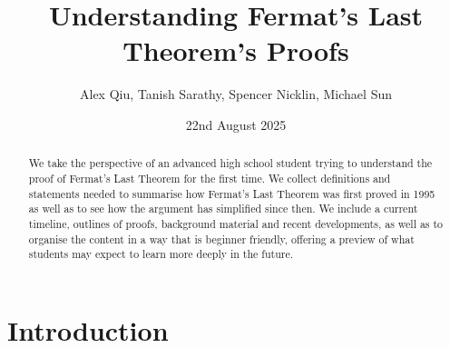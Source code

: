 \documentclass{article}
\title{Understanding Fermat's Last Theorem's Proofs}
\author{Alex Qiu, Tanish Sarathy, Spencer Nicklin, Michael Sun}
\date{22nd August 2025}
\theoremstyle{definition}
\theoremstyle{definition}
\theoremstyle{definition}
\begin{document}
\maketitle

\begin{abstract}
We take the perspective of an advanced high school student trying to understand the proof of Fermat's Last Theorem for the first time. We collect definitions and statements needed to summarise how Fermat's Last Theorem was first proved in 1995 as well as to see how the argument has simplified since then. We include a current timeline, outlines of proofs, background material and recent developments, as well as to organise the content in a way that is beginner friendly, offering a preview of what students may expect to learn more deeply in the future.
\end{abstract}

\tableofcontents







\section{Introduction}




\end{document}
